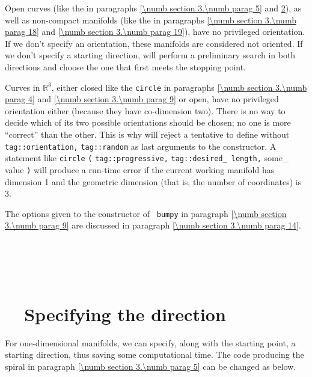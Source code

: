 Open curves (like the {\small\tt{}} in paragraphs \ref{\numb section 3.\numb parag 5} and
\ref{\numb section 3.\numb parag 12}), as well as non-compact manifolds
(like the {\small\tt{}} in paragraphs \ref{\numb section 3.\numb parag 18} and
\ref{\numb section 3.\numb parag 19}), have no privileged orientation.
If we don't specify an orientation, these manifolds are considered not oriented.
If we don't specify a starting direction, {\maniFEM} will perform a preliminary search
in both directions and choose the one that first meets the stopping point.

Curves in $ \mathbb{R}^3 $, either closed like the {\small\tt circle} in paragraphs
\ref{\numb section 3.\numb parag 4} and \ref{\numb section 3.\numb parag 9} or open,
have no privileged orientation either (because they have co-dimension two).
There is no way to decide which of its two possible orientations
should be chosen; no one is more ``correct'' than the other.
This is why {\maniFEM} will reject a tentative to define {\small\tt{}} without
{\small\tt\textcolor{tag}{tag}::orientation,} {\small\tt\textcolor{tag}{tag}::random}
as last arguments to the {\small\tt{}} constructor.
A statement like {\small\tt{}} {\small\tt circle} {\small\tt (}
{\small\tt\textcolor{tag}{tag}::progressive,} {\small\tt\textcolor{tag}{tag}::desired\_\,length,}
some\_\,value {\small\tt)}
will produce a run-time error if the current working manifold has dimension 1 and
the geometric dimension (that is, the number of coordinates) is 3.

The options given to the constructor of {\small\tt{} bumpy} in paragraph
\ref{\numb section 3.\numb parag 9} are discussed in paragraph
\ref{\numb section 3.\numb parag 14}.


\section{~~\cinza{[empty]}}\label{\numb section 3.\numb parag 11}


\section{~~Specifying the direction}\label{\numb section 3.\numb parag 12}

For one-dimensional manifolds, we can specify, along with the starting point,
a starting direction, thus saving some computational time.
The code producing the spiral in paragraph \ref{\numb section 3.\numb parag 5}
can be changed as below.

